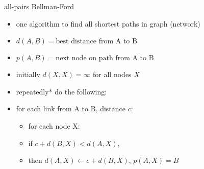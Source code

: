 \usetikzlibrary{arrows.meta,matrix}
\begin{frame}{all-pairs Bellman-Ford}
    \begin{itemize}
    \item one algorithm to find all shortest paths in graph (network)
    \vspace{.5cm}
    \item $d(A,B) = \text{best distance from A to B}$
    \item $p(A,B) = \text{next node on path from A to B}$
    \item initially $d(X,X) = \infty$ for all nodes $X$
    \item repeatedly* do the following:
    \vspace{.5cm}
    \item for each link from A to B, distance $c$:
        \begin{itemize}
        \item for each node X:
        \item if $c + d(B, X) < d(A, X)$, \\
        \item then $d(A,X) \leftarrow c+d(B,X)$, $p(A,X) = B$
        \end{itemize}
    \end{itemize}
\end{frame}

